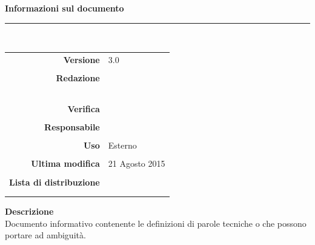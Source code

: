 \begin{titlepage}
\begin{center}
	\vspace{1cm}
	\textbf{Informazioni sul documento}\\
    \rule{10cm}{.4pt} \\
	\begin{table}[h]
	\begin{center}
	\begin{tabular}{r | l}
		\textbf{Versione} & 3.0 \\ \\
		\textbf{Redazione} & \ReAn \\
			& \GoIs \\
			& \MaMo \\
			& \CoMa \\
			& \VeFe \\ \\
		\textbf{Verifica} &\CaMa \\ \\
		\textbf{Responsabile} & \CoMa \\ \\
		\textbf{Uso} & Esterno \\ \\
		\textbf{Ultima modifica} & 21 Agosto 2015 \\ \\
		\textbf{Lista di distribuzione} & \Vardanega \\ 
		    & \Cardin \\
		    & \Zucchetti
	\end{tabular}
	\end{center}
	\end{table}
			\textbf{Descrizione} \\
			Documento informativo contenente le definizioni di parole tecniche o che possono portare ad ambiguità. 
	\end{center}
\end{titlepage}